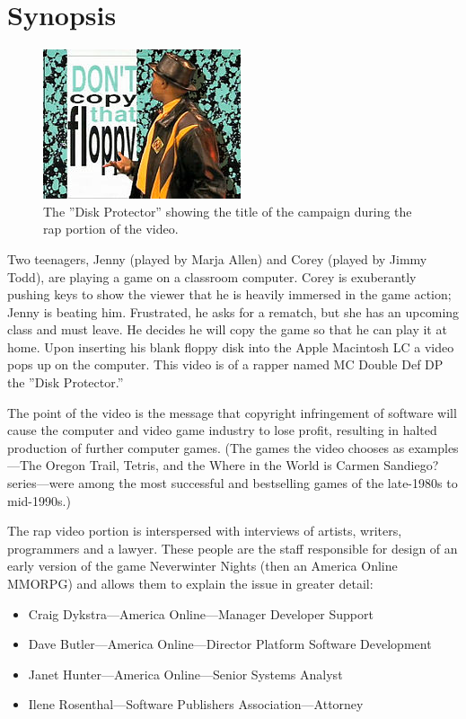 
\chapter{Synopsis}

\begin{figure}
\includegraphics{220px-Dontcopythatfloppy.jpg}
\caption{The ''Disk Protector'' showing the title of the campaign during the rap portion of the video.}
\label{fig:disk_protector}
\end{figure}

Two teenagers, Jenny (played by Marja Allen) and Corey (played by Jimmy Todd), are playing a game on a classroom computer. Corey is exuberantly pushing keys to show the viewer that he is heavily immersed in the game action; Jenny is beating him. Frustrated, he asks for a rematch, but she has an upcoming class and must leave. He decides he will copy the game so that he can play it at home. Upon inserting his blank floppy disk into the Apple Macintosh LC a video pops up on the computer. This video is of a rapper named MC Double Def DP the ''Disk Protector.''

The point of the video is the message that copyright infringement of software will cause the computer and video game industry to lose profit, resulting in halted production of further computer games. \cite{onpi} (The games the video chooses as examples—The Oregon Trail, Tetris, and the Where in the World is Carmen Sandiego? series—were among the most successful and bestselling games of the late-1980s to mid-1990s.)

The rap video portion is interspersed with interviews of artists, writers, programmers and a lawyer. These people are the staff responsible for design of an early version of the game Neverwinter Nights (then an America Online MMORPG) and allows them to explain the issue in greater detail:
\begin{itemize}

    \item Craig Dykstra—America Online—Manager Developer Support
    \item Dave Butler—America Online—Director Platform Software Development
    \item Janet Hunter—America Online—Senior Systems Analyst
    \item Ilene Rosenthal—Software Publishers Association—Attorney
    
\end{itemize}

